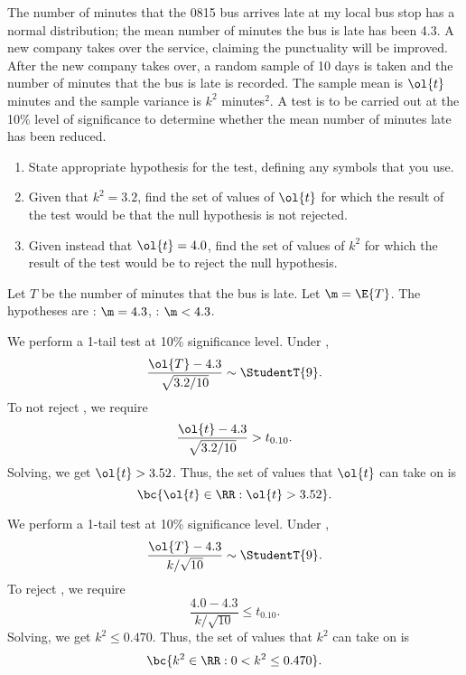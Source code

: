 \begin{problem}
    The number of minutes that the 0815 bus arrives late at my local bus stop has a normal distribution; the mean number of minutes the bus is late has been 4.3. A new company takes over the service, claiming the punctuality will be improved. After the new company takes over, a random sample of 10 days is taken and the number of minutes that the bus is late is recorded. The sample mean is $\ol{t}$ minutes and the sample variance is $k^2$ minutes$^2$. A test is to be carried out at the 10\% level of significance to determine whether the mean number of minutes late has been reduced.

    \begin{enumerate}
        \item State appropriate hypothesis for the test, defining any symbols that you use.
        \item Given that $k^2 = 3.2$, find the set of values of $\ol{t}$ for which the result of the test would be that the null hypothesis is not rejected.
        \item Given instead that $\ol{t} = 4.0$, find the set of values of $k^2$ for which the result of the test would be to reject the null hypothesis.
    \end{enumerate}
\end{problem}
\begin{solution}
    \begin{ppart}
        Let $T$ be the number of minutes that the bus is late. Let $\m = \E{T}$. The hypotheses are \nullhyp: $\m = 4.3$, \althyp: $\m < 4.3$.
    \end{ppart}
    \begin{ppart}
        We perform a 1-tail test at 10\% significance level. Under \nullhyp, \[\frac{\ol{T} - 4.3}{\sqrt{3.2/10}} \sim \StudentT{9}.\] To not reject \nullhyp, we require \[\frac{\ol{t} - 4.3}{\sqrt{3.2/10}} > t_{0.10}.\] Solving, we get $\ol{t} > 3.52$. Thus, the set of values that $\ol{t}$ can take on is \[\bc{\ol{t} \in \RR: \ol{t} > 3.52}.\]
    \end{ppart}
    \begin{ppart}
        We perform a 1-tail test at 10\% significance level. Under \nullhyp, \[\frac{\ol{T} - 4.3}{k/\sqrt{10}} \sim \StudentT{9}.\] To reject \nullhyp, we require \[\frac{4.0 - 4.3}{k/\sqrt{10}} \leq t_{0.10}.\] Solving, we get $k^2 \leq 0.470$. Thus, the set of values that $k^2$ can take on is \[\bc{k^2 \in \RR : 0 < k^2 \leq 0.470}.\]
    \end{ppart}
\end{solution}